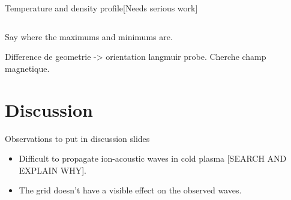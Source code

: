 \documentclass[10pt]{beamer}
\begin{document}
\begin{frame}{Temperature and density profile}{[Needs serious work]}
    \begin{columns}
        \centering

        \centering

    \end{columns}
    Say where the maximums and minimums are.

    Difference de geometrie -> orientation langmuir probe. Cherche champ magnetique.
    

\end{frame}


\section{Discussion}
\begin{frame}{Observations to put in discussion slides}
    \begin{itemize}
        \item Difficult to propagate ion-acoustic waves in cold plasma [SEARCH AND EXPLAIN WHY].
        \item The grid doesn't have a visible effect on the observed waves.
    \end{itemize}
\end{frame}
\end{document}
